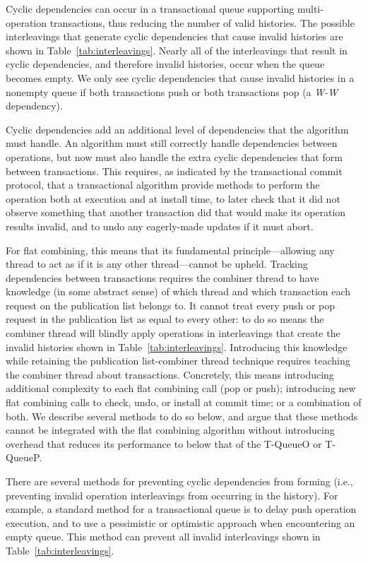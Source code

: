 Cyclic dependencies can occur in a transactional queue supporting multi-operation transactions, thus reducing the number of valid histories. The possible interleavings that generate cyclic dependencies that cause invalid histories are shown in Table~\ref{tab:interleavings}. Nearly all of the interleavings that result in cyclic dependencies, and therefore invalid histories, occur when the queue becomes empty. 
We only see cyclic dependencies that cause invalid histories in a nonempty queue if both transactions push or both transactions pop (a \emph{W-W} dependency).

Cyclic dependencies add an additional level of dependencies that the algorithm must handle. An algorithm must still correctly handle dependencies between operations, but now must also handle the extra cyclic dependencies that form between transactions. This requires, as indicated by the transactional commit protocol, that a transactional algorithm provide methods to perform the operation both at execution and at install time, to later check that it did not observe something that another transaction did that would make its operation results invalid, and to undo any eagerly-made updates if it must abort. 

For flat combining, this means that its fundamental principle---allowing any thread to act as if it is any other thread---cannot be upheld. Tracking dependencies between transactions requires the combiner thread to have knowledge (in some abstract sense) of which thread and which transaction each request on the publication list belongs to. It cannot treat every push or pop request in the publication list as equal to every other: to do so means the combiner thread will blindly apply operations in interleavings that create the invalid histories shown in Table~\ref{tab:interleavings}.
Introducing this knowledge while retaining the publication list-combiner thread technique requires teaching the combiner thread about transactions. Concretely, this means introducing additional complexity to each flat combining call (pop or push); introducing new flat combining calls to check, undo, or install at commit time; or a combination of both. 
We describe several methods to do so below, and argue that these methods cannot be integrated with the flat combining algorithm without introducing overhead that reduces its performance to below that of the T-QueueO or T-QueueP.

There are several methods for preventing cyclic dependencies from forming (i.e., preventing invalid operation interleavings from occurring in the history). For example, a standard method for a transactional queue is to delay push operation execution, and to use a pessimistic or optimistic approach when encountering an empty queue. This method can prevent all invalid interleavings shown in Table~\ref{tab:interleavings}.

